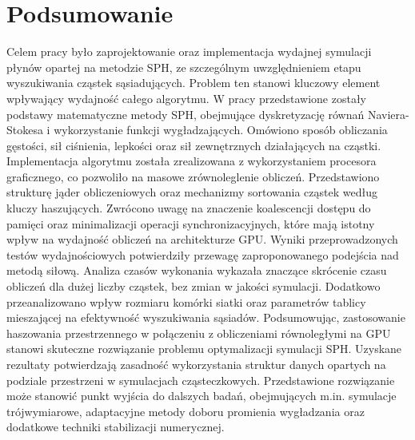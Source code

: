 \documentclass{article}
\begin{document}
\section{Podsumowanie}
Celem pracy było zaprojektowanie oraz implementacja wydajnej symulacji płynów opartej na metodzie SPH, ze szczególnym uwzględnieniem etapu wyszukiwania cząstek sąsiadujących. Problem ten stanowi kluczowy element wpływający wydajność całego algorytmu.\newline\newline
\indent
W pracy przedstawione zostały podstawy matematyczne metody SPH, obejmujące dyskretyzację równań Naviera-Stokesa i wykorzystanie funkcji wygładzających. Omówiono sposób obliczania gęstości, sił ciśnienia, lepkości oraz sił zewnętrznych działających na cząstki.\newline\newline
\indent
Implementacja algorytmu została zrealizowana z wykorzystaniem procesora graficznego, co pozwoliło na masowe zrównoleglenie obliczeń. Przedstawiono strukturę jąder obliczeniowych oraz mechanizmy sortowania cząstek według kluczy haszujących. Zwrócono uwagę na znaczenie koalescencji dostępu do pamięci oraz minimalizacji operacji synchronizacyjnych, które mają istotny wpływ na wydajność obliczeń na architekturze GPU.\newline\newline
\indent
Wyniki przeprowadzonych testów wydajnościowych potwierdziły przewagę zaproponowanego podejścia nad metodą siłową. Analiza czasów wykonania wykazała znaczące skrócenie czasu obliczeń dla dużej liczby cząstek, bez zmian w jakości symulacji. Dodatkowo przeanalizowano wpływ rozmiaru komórki siatki oraz parametrów tablicy mieszającej na efektywność wyszukiwania sąsiadów.\newline\newline
\indent
Podsumowując, zastosowanie haszowania przestrzennego w połączeniu z obliczeniami równoległymi na GPU stanowi skuteczne rozwiązanie problemu optymalizacji symulacji SPH. Uzyskane rezultaty potwierdzają zasadność wykorzystania struktur danych opartych na podziale przestrzeni w symulacjach cząsteczkowych. Przedstawione rozwiązanie może stanowić punkt wyjścia do dalszych badań, obejmujących m.in. symulacje trójwymiarowe, adaptacyjne metody doboru promienia wygładzania oraz dodatkowe techniki stabilizacji numerycznej.\newline

\newpage
\end{document}
